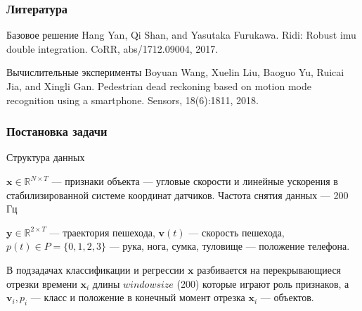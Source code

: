 \documentclass{beamer}
\begin{document}
\begin{frame}
\frametitle{Литература} %
\begin{block}{Базовое решение}
    Hang Yan, Qi Shan, and Yasutaka Furukawa. Ridi: Robust imu double integration. CoRR, abs/1712.09004, 2017.
\end{block}
\begin{block}{Вычислительные эксперименты}
    Boyuan Wang, Xuelin Liu, Baoguo Yu, Ruicai Jia, and Xingli Gan. Pedestrian dead reckoning
based on motion mode recognition using a smartphone. Sensors, 18(6):1811, 2018.
\end{block}
\end{frame}

\begin{frame}
\frametitle{Постановка задачи}
\begin{block}{Структура данных}


$\mathbf{x} \in \mathbb{R}^{N \times T} $ --- признаки объекта --- угловые скорости и линейные ускорения в стабилизированной системе координат датчиков. Частота снятия данных --- 200 Гц

$\mathbf{y} \in \mathbb{R}^{2 \times T}$ --- траектория пешехода, 
$\mathbf{v}(t)$ --- скорость пешехода, $p(t) \in  P = \{0, 1, 2, 3\}$ --- рука, нога, сумка, туловище --- положение телефона.

В подзадачах классификации и регрессии $\mathbf{x}$ разбивается на перекрывающиеся отрезки времени $\mathbf{x}_i$ длины $windowsize$ (200) которые играют роль признаков, а $\mathbf{v}_i, p_i$ --- класс и положение в конечный момент отрезка $\mathbf{x}_i$ --- объектов. 
\end{block}

\end{frame}

\end{document}

